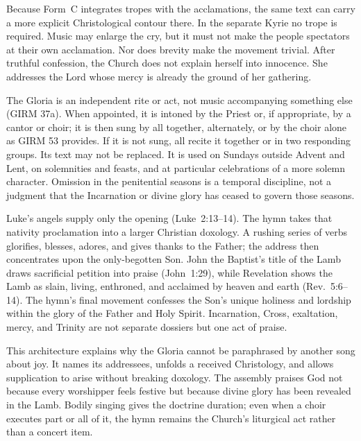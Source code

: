 Because Form~C integrates tropes with the acclamations, the same text can carry a more explicit Christological contour there. In the separate Kyrie no trope is required. Music may enlarge the cry, but it must not make the people spectators at their own acclamation. Nor does brevity make the movement trivial. After truthful confession, the Church does not explain herself into innocence. She addresses the Lord whose mercy is already the ground of her gathering.


The Gloria is an independent rite or act, not music accompanying something else (GIRM 37a). When appointed, it is intoned by the Priest or, if appropriate, by a cantor or choir; it is then sung by all together, alternately, or by the choir alone as GIRM 53 provides. If it is not sung, all recite it together or in two responding groups. Its text may not be replaced. It is used on Sundays outside Advent and Lent, on solemnities and feasts, and at particular celebrations of a more solemn character. Omission in the penitential seasons is a temporal discipline, not a judgment that the Incarnation or divine glory has ceased to govern those seasons.

Luke's angels supply only the opening (Luke~2:13--14). The hymn takes that nativity proclamation into a larger Christian doxology. A rushing series of verbs glorifies, blesses, adores, and gives thanks to the Father; the address then concentrates upon the only-begotten Son. John the Baptist's title of the Lamb draws sacrificial petition into praise (John~1:29), while Revelation shows the Lamb as slain, living, enthroned, and acclaimed by heaven and earth (Rev.~5:6--14). The hymn's final movement confesses the Son's unique holiness and lordship within the glory of the Father and Holy Spirit. Incarnation, Cross, exaltation, mercy, and Trinity are not separate dossiers but one act of praise.

This architecture explains why the Gloria cannot be paraphrased by another song about joy. It names its addressees, unfolds a received Christology, and allows supplication to arise without breaking doxology. The assembly praises God not because every worshipper feels festive but because divine glory has been revealed in the Lamb. Bodily singing gives the doctrine duration; even when a choir executes part or all of it, the hymn remains the Church's liturgical act rather than a concert item.

